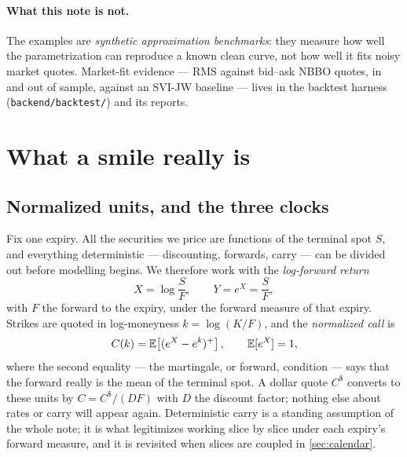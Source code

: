 \documentclass[11pt]{article}
\begin{document}
\paragraph{What this note is not.}  The examples are \emph{synthetic
approximation benchmarks}: they measure how well the parametrization can
reproduce a known clean curve, not how well it fits noisy market quotes.
Market-fit evidence --- RMS against bid--ask NBBO quotes, in and out of
sample, against an SVI-JW baseline --- lives in the backtest harness
(\texttt{backend/backtest/}) and its reports.

\section{What a smile really is}
\label{sec:slice}

\subsection{Normalized units, and the three clocks}

Fix one expiry.  All the securities we price are functions of the terminal
spot $S$, and everything deterministic --- discounting, forwards, carry ---
can be divided out before modelling begins.  We therefore work with the
\emph{log-forward return}
\begin{equation}
X=\log\frac{S}{F},
\qquad Y=e^{X}=\frac{S}{F},
\label{eq:X_def}
\end{equation}
with $F$ the forward to the expiry, under the forward measure of that expiry.
Strikes are quoted in log-moneyness $k=\log(K/F)$, and the \emph{normalized
call} is
\begin{equation}
C(k)=\mathbb{E}\!\left[(e^{X}-e^{k})^{+}\right],
\qquad \mathbb{E}[e^{X}]=1,
\label{eq:call_def}
\end{equation}
where the second equality --- the martingale, or forward, condition --- says
that the forward really is the mean of the terminal spot.  A dollar quote
$C^{\$}$ converts to these units by $C=C^{\$}/(DF)$ with $D$ the discount
factor; nothing else about rates or carry will appear again.  Deterministic
carry is a standing assumption of the whole note; it is what legitimizes
working slice by slice under each expiry's forward measure, and it is
revisited when slices are coupled in \cref{sec:calendar}.
\end{document}
